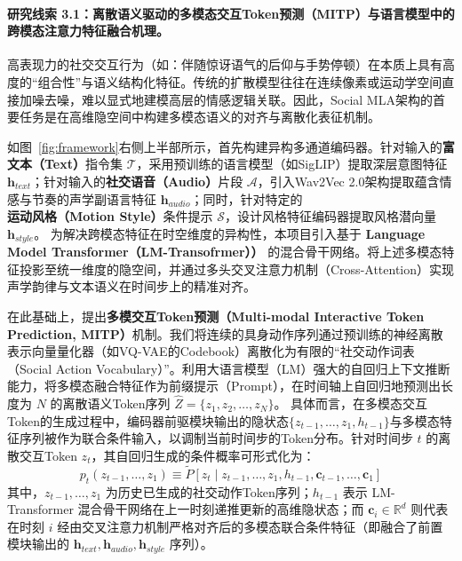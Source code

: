 \paragraph{\textbf{研究线索 3.1：离散语义驱动的多模态交互Token预测（MITP）与语言模型中的跨模态注意力特征融合机理。}}

高表现力的社交交互行为（如：伴随惊讶语气的后仰与手势停顿）在本质上具有高度的“组合性”与语义结构化特征。传统的扩散模型往往在连续像素或运动学空间直接加噪去噪，难以显式地建模高层的情感逻辑关联。因此，Social MLA架构的首要任务是在高维隐空间中构建多模态语义的对齐与离散化表征机制。

如图~\ref{fig:framework}右侧上半部所示，首先构建异构多通道编码器。针对输入的\textbf{富文本（Text）}指令集 $\mathcal{T}$，采用预训练的语言模型（如SigLIP）提取深层意图特征 $\mathbf{h}_{text}$；针对输入的\textbf{社交语音（Audio）}片段 $\mathcal{A}$，引入Wav2Vec 2.0架构提取蕴含情感与节奏的声学副语言特征 $\mathbf{h}_{audio}$；同时，针对特定的\textbf{运动风格（Motion Style）}条件提示 $\mathcal{S}$，设计风格特征编码器提取风格潜向量 $\mathbf{h}_{style}$。
为解决跨模态特征在时空维度的异构性，本项目引入基于 \textbf{Language Model Transformer（LM-Transofrmer））} 的混合骨干网络。将上述多模态特征投影至统一维度的隐空间，并通过多头交叉注意力机制（Cross-Attention）实现声学韵律与文本语义在时间步上的精准对齐。

在此基础上，提出\textbf{多模交互Token预测（Multi-modal Interactive Token Prediction, MITP）}机制。我们将连续的具身动作序列通过预训练的神经离散表示向量量化器（如VQ-VAE的Codebook）离散化为有限的“社交动作词表（Social Action Vocabulary）”。利用大语言模型（LM）强大的自回归上下文推断能力，将多模态融合特征作为前缀提示（Prompt），在时间轴上自回归地预测出长度为 $N$ 的离散语义Token序列 $\hat{Z} = \{z_1, z_2, \dots, z_N\}$。
具体而言，在多模态交互Token的生成过程中，编码器前驱模块输出的隐状态$\{z_{t-1}, \dots, z_1, h_{t-1}\}$与多模态特征序列被作为联合条件输入，以调制当前时间步的Token分布。针对时间步 $t$ 的离散交互Token $z_t$，其自回归生成的条件概率可形式化为：
\begin{equation}
    p_t(z_{t-1}, \dots, z_1) \equiv \widetilde{P}\left[z_t \mid z_{t-1}, \dots, z_1, h_{t-1}, \mathbf{c}_{t-1}, \dots, \mathbf{c}_1 \right]
\end{equation}
其中，$z_{t-1}, \dots, z_1$ 为历史已生成的社交动作Token序列；$h_{t-1}$ 表示 LM-Transformer 混合骨干网络在上一时刻递推更新的高维隐状态；而 $\mathbf{c}_i \in \mathbb{R}^{d}$ 则代表在时刻 $i$ 经由交叉注意力机制严格对齐后的多模态联合条件特征（即融合了前置模块输出的 $\mathbf{h}_{text}, \mathbf{h}_{audio}, \mathbf{h}_{style}$ 序列）。

